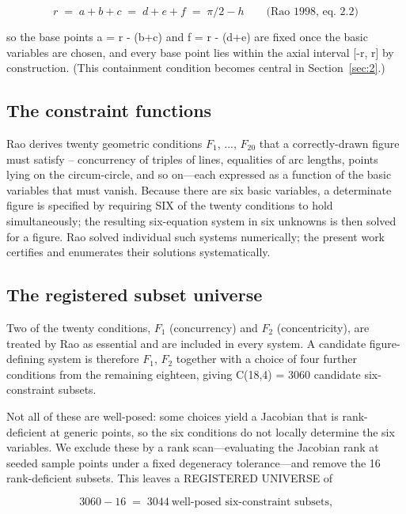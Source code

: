 \documentclass[pdflatex,sn-mathphys-num]{sn-jnl}
\begin{document}
\begin{equation}\label{eq:rao22} r \;=\; a+b+c \;=\; d+e+f \;=\; \pi/2-h \qquad\text{(Rao 1998, eq.~2.2)}\end{equation}

so the base points a = r - (b+c) and f = r - (d+e) are fixed once the basic variables are chosen, and every base point lies within the axial interval [-r, r] by construction. (This containment condition becomes central in Section~\ref{sec:2}.)

\subsection{The constraint functions}\label{sec:1.2}

Rao derives twenty geometric conditions $F_{1}$, ..., $F_{20}$ that a correctly-drawn figure must satisfy -- concurrency of triples of lines, equalities of arc lengths, points lying on the circum-circle, and so
on---each expressed as a function of the basic variables that must vanish. Because there are six basic variables, a determinate figure is specified by requiring SIX of the twenty conditions to hold simultaneously; the resulting six-equation system in six unknowns is then solved for a figure. Rao
solved individual such systems numerically; the present work certifies and enumerates their solutions
systematically.

\subsection{The registered subset universe}\label{sec:1.3}

Two of the twenty conditions, $F_{1}$ (concurrency) and $F_{2}$ (concentricity), are treated by Rao as essential and are included in every system. A candidate figure-defining system is therefore {$F_{1}$, $F_{2}$} together with a choice of four further conditions from the remaining eighteen, giving C(18,4) = 3060
candidate six-constraint subsets.

Not all of these are well-posed: some choices yield a Jacobian that is rank-deficient at generic points, so the six conditions do not locally determine the six variables. We exclude these by a rank
scan---evaluating the Jacobian rank at seeded sample points under a fixed degeneracy tolerance---and remove the 16 rank-deficient subsets. This leaves a REGISTERED UNIVERSE of

\[ 3060-16 \;=\; 3044 \ \text{well-posed six-constraint subsets,} \]
\end{document}
